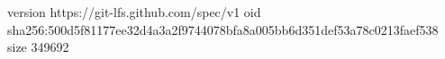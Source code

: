 version https://git-lfs.github.com/spec/v1
oid sha256:500d5f81177ee32d4a3a2f9744078bfa8a005bb6d351def53a78c0213faef538
size 349692
